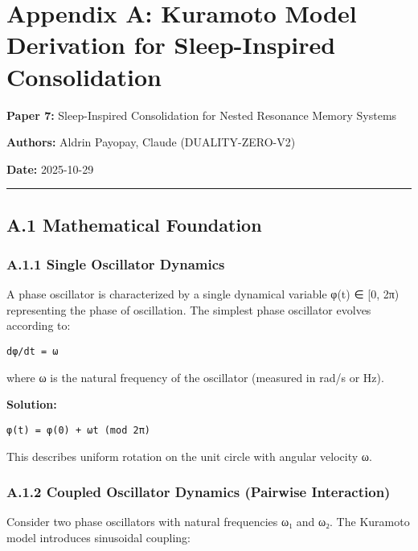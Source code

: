 \documentclass[
]{article}
\author{}
\date{}
\begin{document}
\section{Appendix A: Kuramoto Model Derivation for Sleep-Inspired
Consolidation}\label{appendix-a-kuramoto-model-derivation-for-sleep-inspired-consolidation}

\textbf{Paper 7:} Sleep-Inspired Consolidation for Nested Resonance
Memory Systems

\textbf{Authors:} Aldrin Payopay, Claude (DUALITY-ZERO-V2)

\textbf{Date:} 2025-10-29

\begin{center}\rule{0.5\linewidth}{0.5pt}\end{center}

\subsection{A.1 Mathematical
Foundation}\label{a.1-mathematical-foundation}

\subsubsection{A.1.1 Single Oscillator
Dynamics}\label{a.1.1-single-oscillator-dynamics}

A phase oscillator is characterized by a single dynamical variable φ(t)
∈ {[}0, 2π) representing the phase of oscillation. The simplest phase
oscillator evolves according to:

\begin{verbatim}
dφ/dt = ω
\end{verbatim}

where ω is the natural frequency of the oscillator (measured in rad/s or
Hz).

\textbf{Solution:}

\begin{verbatim}
φ(t) = φ(0) + ωt (mod 2π)
\end{verbatim}

This describes uniform rotation on the unit circle with angular velocity
ω.

\subsubsection{A.1.2 Coupled Oscillator Dynamics (Pairwise
Interaction)}\label{a.1.2-coupled-oscillator-dynamics-pairwise-interaction}

Consider two phase oscillators with natural frequencies ω₁ and ω₂. The
Kuramoto model introduces sinusoidal coupling:
\end{document}
